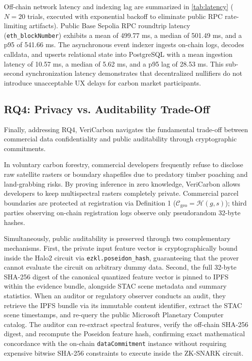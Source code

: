 \documentclass[preprint,12pt]{elsarticle}
\begin{document}


Off-chain network latency and indexing lag are summarized in \autoref{tab:latency} ($N=20$ trials, executed with exponential backoff to eliminate public RPC rate-limiting artifacts). Public Base Sepolia RPC roundtrip latency (\texttt{eth\_blockNumber}) exhibits a mean of 499.77 ms, a median of 501.49 ms, and a p95 of 541.66 ms. The asynchronous event indexer ingests on-chain logs, decodes calldata, and upserts relational state into PostgreSQL with a mean ingestion latency of 10.57 ms, a median of 5.62 ms, and a p95 lag of 28.53 ms. This sub-second synchronization latency demonstrates that decentralized nullifiers do not introduce unacceptable UX delays for carbon market participants.

\subsection{RQ4: Privacy vs. Auditability Trade-Off}

Finally, addressing RQ4, VeriCarbon navigates the fundamental trade-off between commercial data confidentiality and public auditability through cryptographic commitments. 

In voluntary carbon forestry, commercial developers frequently refuse to disclose raw satellite rasters or boundary shapefiles due to predatory timber poaching and land-grabbing risks. By proving inference in zero knowledge, VeriCarbon allows developers to keep multispectral rasters completely private. Commercial parcel boundaries are protected at registration via Definition 1 ($\mathcal{C}_{\text{geo}} = \mathcal{H}(g, s)$); third parties observing on-chain registration logs observe only pseudorandom 32-byte hashes.

Simultaneously, public auditability is preserved through two complementary mechanisms. First, the private input feature vector is cryptographically bound inside the Halo2 circuit via \texttt{ezkl.poseidon\_hash}, guaranteeing that the prover cannot evaluate the circuit on arbitrary dummy data. Second, the full 32-byte SHA-256 digest of the canonical quantized feature vector is pinned to IPFS within the evidence bundle, alongside STAC scene metadata and summary statistics. When an auditor or regulatory observer conducts an audit, they retrieve the IPFS bundle via its immutable content identifier, extract the STAC scene timestamps, and re-query the public Microsoft Planetary Computer catalog. The auditor can re-extract spectral features, verify the off-chain SHA-256 digest, and recompute the Poseidon feature hash, confirming exact mathematical concordance with the on-chain \texttt{dataCommitment} instance without requiring expensive bitwise SHA-256 constraints to execute inside the ZK-SNARK circuit.
\end{document}
